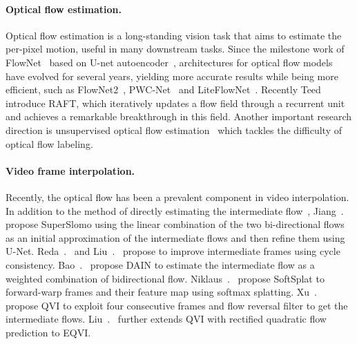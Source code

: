 \documentclass[final]{cvpr}
\begin{document}
\paragraph{Optical flow estimation.} Optical flow estimation is a long-standing vision task that aims to estimate the per-pixel motion, useful in many downstream tasks. Since the milestone work of FlowNet~\cite{dosovitskiy2015flownet} based on U-net autoencoder~\cite{ronneberger2015u}, architectures for optical flow models have evolved for several years, yielding more accurate results while being more efficient, such as FlowNet2~\cite{ilg2017flownet}, PWC-Net~\cite{sun2018pwc} and LiteFlowNet~\cite{hui2018liteflownet}. Recently Teed~\etal~\cite{teed2020raft} introduce RAFT, which iteratively updates a flow field through a recurrent unit and achieves a remarkable breakthrough in this field. Another important research direction is unsupervised optical flow estimation~\cite{meister2017unflow, jonschkowski2020matters, luo2020upflow} which tackles the difficulty of optical flow labeling.







\paragraph{Video frame interpolation.} Recently, the optical flow has been a prevalent component in video interpolation. In addition to the method of directly estimating the intermediate flow~\cite{liu2017video, lee2020adacof, park2020bmbc}, Jiang~\etal.~\cite{jiang2018super} propose SuperSlomo using the linear combination of the two bi-directional flows as an initial approximation of the intermediate flows and then refine them using U-Net. Reda~\etal.~\cite{reda2019unsupervised} and Liu~\etal.~\cite{liu2019deep} propose to improve intermediate frames using cycle
consistency. Bao~\etal.~\cite{bao2019depth} propose DAIN to estimate the intermediate flow as a weighted combination of bidirectional flow. Niklaus~\etal.~\cite{niklaus2020softmax} propose SoftSplat to forward-warp frames and their feature map using softmax splatting. Xu~\etal.~\cite{xu2019quadratic} propose QVI to exploit four consecutive frames and flow reversal filter to get the intermediate flows. Liu~\etal.~\cite{liu2020enhanced} further extends QVI with rectified quadratic flow prediction to EQVI. 
\end{document}
